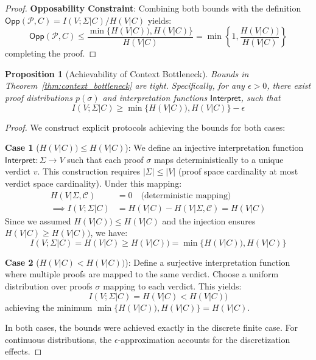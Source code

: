 \documentclass{ieeeaccess}
\newtheorem{proposition}{Proposition}[subsection]
\newtheorem{proof}{Proof}[section]
\begin{document}
\begin{proof}
\textbf{Opposability Constraint}: Combining both bounds with the definition $\mathsf{Opp}(\mathcal{P}, C) = I(V;\Sigma|C)/H(V|C)$ yields:
\begin{equation}
\mathsf{Opp}(\mathcal{P}, C) \leq \frac{\min\{H(V|C)), H(V|C)\}}{H(V|C)} = \min\left\{1, \frac{H(V|C))}{H(V|C)}\right\}
\end{equation}
completing the proof.
\end{proof}

\begin{proposition}[Achievability of Context Bottleneck]\label{prop:achievability}
Bounds in Theorem~\ref{thm:context_bottleneck} are tight. Specifically, for any $\epsilon > 0$, there exist proof distributions $p(\sigma)$ and interpretation functions $\mathsf{Interpret}$, such that
\begin{equation}
I(V;\Sigma|C) \geq \min\{H(V|C)), H(V|C)\} - \epsilon
\end{equation}
\end{proposition}

\begin{proof}
We construct explicit protocols achieving the bounds for both cases:

\textbf{Case 1} ($H(V|C)) \leq H(V|C)$): We define an injective interpretation function $\mathsf{Interpret}: \Sigma \to V$ such that each proof $\sigma$ maps deterministically to a unique verdict $v$. This construction requires $|\Sigma| \leq |V|$ (proof space cardinality at most verdict space cardinality). Under this mapping:
\begin{align*}
H(V|\Sigma,\mathcal{C}) &= 0 \quad \text{(deterministic mapping)} \\
\implies I(V;\Sigma|C) &= H(V|C) - H(V|\Sigma,\mathcal{C}) = H(V|C)
\end{align*}
Since we assumed $H(V|C)) \leq H(V|C)$ and the injection ensures $H(V|C) \geq H(V|C))$, we have:
\begin{equation}
I(V;\Sigma|C) = H(V|C) \geq H(V|C)) = \min\{H(V|C)), H(V|C)\}
\end{equation}

\textbf{Case 2} ($H(V|C) < H(V|C))$): Define a surjective interpretation function where multiple proofs are mapped to the same verdict. Choose a uniform distribution over proofs $\sigma$ mapping to each verdict. This yields:
\begin{equation}
I(V;\Sigma|C) = H(V|C) < H(V|C))
\end{equation}
achieving the minimum $\min\{H(V|C)), H(V|C)\} = H(V|C)$.

In both cases, the bounds were achieved exactly in the discrete finite case. For continuous distributions, the $\epsilon$-approximation accounts for the discretization effects.
\end{proof}
\end{document}
